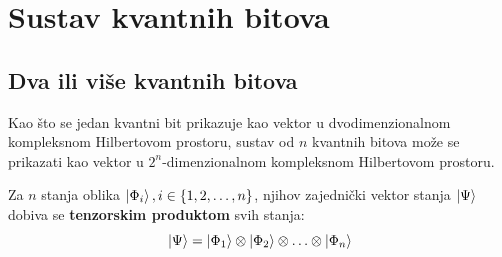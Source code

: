 \section{Sustav kvantnih bitova}

\subsection{Dva ili više kvantnih bitova}
Kao što se jedan kvantni bit prikazuje kao vektor u dvodimenzionalnom kompleksnom Hilbertovom prostoru, sustav od $n$ kvantnih bitova može se prikazati kao vektor u $2^n$-dimenzionalnom kompleksnom Hilbertovom prostoru.

Za $n$ stanja oblika $\ket{\Phi_i},i \in \{1, 2, \ldots, n\}$, njihov zajednički vektor stanja $\ket{\Psi}$ dobiva se \textbf{tenzorskim produktom} svih stanja:
\begin{equation}
\ket{\Psi} = \ket{\Phi_1} \otimes \ket{\Phi_2} \otimes \ldots \otimes \ket{\Phi_n}
\end{equation}

